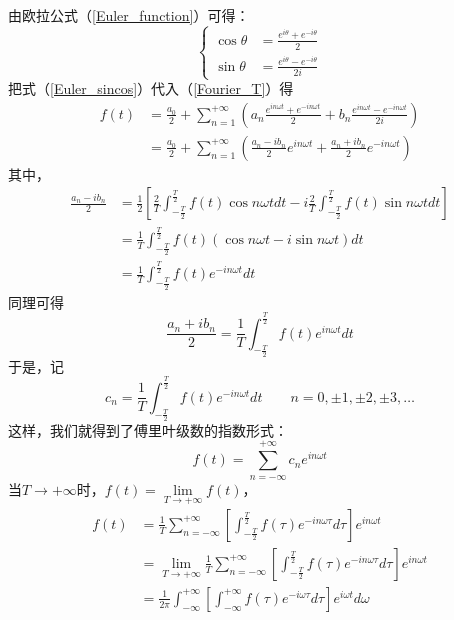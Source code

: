 	由欧拉公式（\ref{Euler_function}）可得：
	\begin{equation}
	\label{Euler_sincos}
	\begin{cases}
		\cos \theta &= \frac{e^{i\theta}+e^{-i\theta}}{2}	\\
		\sin \theta &= \frac{e^{i\theta}-e^{-i\theta}}{2i}
	\end{cases}
	\end{equation}
	把式（\ref{Euler_sincos}）代入（\ref{Fourier_T}）得
	\begin{equation}
	\begin{aligned}
		f(t)
		&=\frac{a_0}{2}+\sum_{n=1}^{+\infty}(a_n\frac{e^{in\omega t}+e^{-in\omega t}}{2}+b_n\frac{e^{in\omega t}-e^{-in\omega t}}{2i})	\\
		&=\frac{a_0}{2}+\sum_{n=1}^{+\infty}(\frac{a_n-ib_n}{2}e^{in\omega t}+\frac{a_n+ib_n}{2}e^{-in\omega t})
	\end{aligned}
	\end{equation}
	其中，
	\begin{equation}
	\begin{aligned}
		\frac{a_n-ib_n}{2}
		&=\frac{1}{2}[\frac{2}{T}\int_{-\frac{T}{2}}^{\frac{T}{2}}f(t)\cos n\omega tdt-i\frac{2}{T}\int_{-\frac{T}{2}}^{\frac{T}{2}}f(t)\sin n\omega tdt]	\\
		&=\frac{1}{T}\int_{-\frac{T}{2}}^{\frac{T}{2}}f(t)(\cos n\omega t-i\sin n\omega t)dt	\\
		&=\frac{1}{T}\int_{-\frac{T}{2}}^{\frac{T}{2}}f(t)e^{-in\omega t}dt
	\end{aligned}
	\end{equation}
	同理可得
	$$
		\frac{a_n+ib_n}{2}=\frac{1}{T}\int_{-\frac{T}{2}}^{\frac{T}{2}}f(t)e^{in\omega t}dt
	$$
	于是，记
	\begin{equation}
		c_n=\frac{1}{T}\int_{-\frac{T}{2}}^{\frac{T}{2}}f(t)e^{-in\omega t}dt \qquad n=0, \pm 1,\pm 2,\pm 3, \dots
	\end{equation}
	这样，我们就得到了傅里叶级数的指数形式：
	\begin{equation}
	\label{Fourier_exp}
		f(t)=\sum_{n=-\infty}^{+\infty}c_ne^{in\omega t}
	\end{equation}
	当$T\to +\infty$时，$f(t)=\lim\limits_{T\to +\infty}f(t)$，
	\begin{equation}
	\label{Fourier_int}
	\begin{aligned}
		f(t)
		&=\frac{1}{T}\sum_{n=-\infty}^{+\infty}[\int_{-\frac{T}{2}}^{\frac{T}{2}}f(\tau)e^{-in\omega \tau}d\tau]e^{in\omega t}	\\
		&=\lim\limits_{T\to +\infty}\frac{1}{T}\sum_{n=-\infty}^{+\infty}[\int_{-\frac{T}{2}}^{\frac{T}{2}}f(\tau)e^{-in\omega \tau}d\tau]e^{in\omega t}	\\
		&=\frac{1}{2\pi}\int_{-\infty}^{+\infty}[\int_{-\infty}^{+\infty}f(\tau)e^{-i\omega \tau}d\tau]e^{i\omega t}d\omega
	\end{aligned}
	\end{equation}
